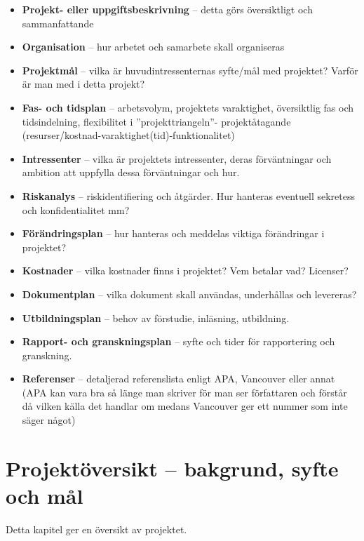 \documentclass[11pt]{article}
\begin{document}
\begin{itemize}
\item \textbf{Projekt- eller uppgiftsbeskrivning} -- detta görs översiktligt och
sammanfattande

\item \textbf{Organisation} -- hur arbetet och samarbete skall organiseras

\item \textbf{Projektmål} -- vilka är huvudintressenternas syfte/mål med
projektet? Varför är man med i detta projekt?

\item \textbf{Fas- och tidsplan} -- arbetsvolym, projektets varaktighet,
översiktlig fas och tidsindelning, flexibilitet i ”projekttriangeln”-
projektåtagande (resurser/kostnad-varaktighet(tid)-funktionalitet)

\item \textbf{Intressenter} -- vilka är projektets intressenter, deras
förväntningar och ambition att uppfylla dessa förväntningar och hur.

\item \textbf{Riskanalys} -- riskidentifiering och åtgärder. Hur hanteras
eventuell sekretess och konfidentialitet mm?

\item \textbf{Förändringsplan} -- hur hanteras och meddelas viktiga förändringar i
projektet?

\item \textbf{Kostnader} -- vilka kostnader finns i projektet? Vem betalar vad?
Licenser?

\item \textbf{Dokumentplan} -- vilka dokument skall användas, underhållas och
levereras?

\item \textbf{Utbildningsplan} -- behov av förstudie, inläsning, utbildning.

\item \textbf{Rapport- och granskningsplan} -- syfte och tider för rapportering
och granskning.

\item \textbf{Referenser} -- detaljerad referenslista enligt APA, Vancouver eller
annat (APA kan vara bra så länge man skriver för man ser författaren
och förstår då vilken källa det handlar om medans Vancouver ger ett
nummer som inte säger något)
\end{itemize}

\section{Projektöversikt -- bakgrund, syfte och mål}
\label{sec:org6488eef}
Detta kapitel ger en översikt av projektet.
\end{document}
